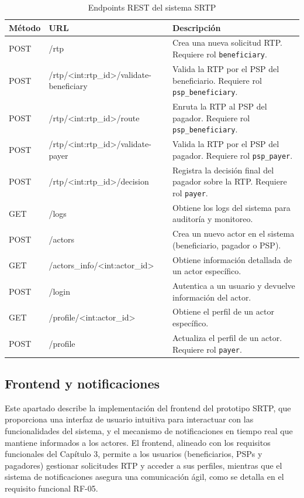 \begin{table}[H]
    \centering
    \caption{Endpoints REST del sistema SRTP}
    \label{tab:endpoints}
    \begin{tabular}{@{}p{2cm}p{5cm}p{7cm}@{}}
        \toprule
        \textbf{Método} & \textbf{URL} & \textbf{Descripción} \\
        \midrule
        POST & /rtp & Crea una nueva solicitud RTP. Requiere rol \texttt{beneficiary}. \\
        POST & /rtp/\textless int:rtp\_id\textgreater /validate-beneficiary & Valida la RTP por el PSP del beneficiario. Requiere rol \texttt{psp\_beneficiary}. \\
        POST & /rtp/\textless int:rtp\_id\textgreater /route & Enruta la RTP al PSP del pagador. Requiere rol \texttt{psp\_beneficiary}. \\
        POST & /rtp/\textless int:rtp\_id\textgreater /validate-payer & Valida la RTP por el PSP del pagador. Requiere rol \texttt{psp\_payer}. \\
        POST & /rtp/\textless int:rtp\_id\textgreater /decision & Registra la decisión final del pagador sobre la RTP. Requiere rol \texttt{payer}. \\
        GET & /logs & Obtiene los logs del sistema para auditoría y monitoreo. \\
        POST & /actors & Crea un nuevo actor en el sistema (beneficiario, pagador o PSP). \\
        GET & /actors\_info/\textless int:actor\_id\textgreater & Obtiene información detallada de un actor específico. \\
        POST & /login & Autentica a un usuario y devuelve información del actor. \\
        GET & /profile/\textless int:actor\_id\textgreater & Obtiene el perfil de un actor específico. \\
        POST & /profile & Actualiza el perfil de un actor. Requiere rol \texttt{payer}. \\
        \bottomrule
    \end{tabular}
\end{table}


\subsection{Frontend y notificaciones}
\label{subsec:frontend}

Este apartado describe la implementación del frontend del prototipo SRTP, que proporciona una interfaz de usuario intuitiva para interactuar con las funcionalidades del sistema, y el mecanismo de notificaciones en tiempo real que mantiene informados a los actores. El frontend, alineado con los requisitos funcionales del Capítulo 3, permite a los usuarios (beneficiarios, PSPs y pagadores) gestionar solicitudes RTP y acceder a sus perfiles, mientras que el sistema de notificaciones asegura una comunicación ágil, como se detalla en el requisito funcional RF-05.

